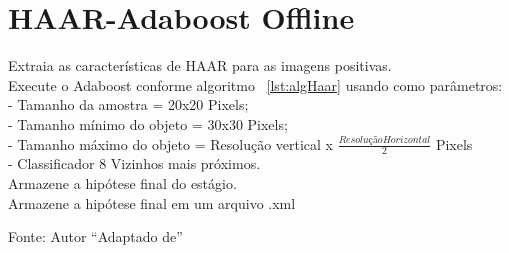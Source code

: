 \section{HAAR-Adaboost Offline}
\begin{algorithm}



{
	{
	Extraia as características de HAAR para as imagens positivas.\\
	Execute o Adaboost conforme algoritmo ~\ref{lst:algHaar} usando como parâmetros:\\
		- Tamanho da amostra = 20x20 Pixels;\\
		- Tamanho mínimo do objeto = 30x30 Pixels;\\
		- Tamanho máximo do objeto = Resolução vertical x \( \frac {Resolução Horizontal}{2}\) Pixels\\
		- Classificador 8 Vizinhos mais próximos. \\
	}
	Armazene a hipótese final do estágio.\\
}
	Armazene a hipótese final em um arquivo .xml

\caption[Algoritmo de Identificação de robôs. (HAAR-Adaboost Offline)]{Fonte: Autor ``Adaptado de''  }
\label{lst:algHaarOF}
\end{algorithm}

\pagebreak

